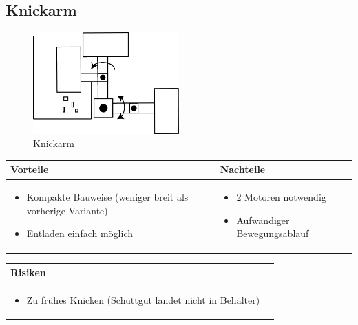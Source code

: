 \pagebreak


\subsection{Knickarm}
\begin{figure} [hbp]
	\centering
	\includegraphics[width=0.5\textwidth]{fig/Beladen_2.png}
	\caption{Knickarm}
\end{figure}


\begin{table}[h]
\begin{tabular}{p{} | p{}}


 \textbf{Vorteile} & \textbf{Nachteile} \\ \hline
	 
\begin{itemize}
\item Kompakte Bauweise (weniger breit als vorherige Variante)
\item Entladen einfach möglich 
\end{itemize}

 
 &
 
\begin{itemize}
\item 2 Motoren notwendig
\item Aufwändiger Bewegungsablauf
\end{itemize}

\end{tabular}
\end{table}

\begin{table}[h]
\begin{tabular}{p{}p{}}


 \textbf{Risiken} & \\ \hline
	 
\begin{itemize}
\item Zu frühes Knicken (Schüttgut landet nicht in Behälter) 
\end{itemize}
 
\end{tabular}
\end{table}

\pagebreak